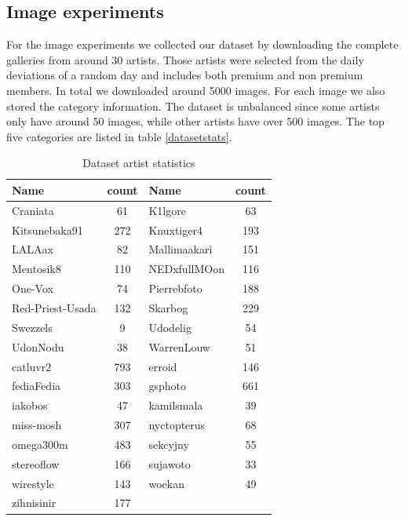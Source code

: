 \subsection{Image experiments}
For the image experiments we collected our dataset by downloading the complete galleries from around 30 artists.
Those artists were selected from the daily deviations of a random day and includes both premium and non premium members.
In total we downloaded around 5000 images. 
For each image we also stored the category information.
The dataset is unbalanced since some artists only have around 50 images, while other artists have over 500 images.
The top five categories are listed in table \ref{datasetstats}.


\begin{table}[htb]
    \centering
    \begin{tabular}
        { | l | c | l | c|} 
        \hline
        Name & count & Name & count \\
        \hline
    Craniata &  61 & K1lgore & 63 \\
    Kitsunebaka91 & 272  & Knuxtiger4 & 193 \\
    LALAax & 82  & Mallimaakari & 151 \\
    Mentosik8 & 110 & NEDxfullMOon & 116 \\
    One-Vox & 74 & Pierrebfoto & 188 \\
    Red-Priest-Usada & 132 & Skarbog & 229 \\
    Swezzels & 9 & Udodelig & 54 \\
    UdonNodu & 38 & WarrenLouw & 51 \\
    catluvr2 & 793 & erroid & 146 \\
    fediaFedia & 303 & gsphoto & 661 \\
    iakobos & 47 & kamilsmala & 39 \\
    miss-mosh & 307 & nyctopterus & 68 \\
    omega300m & 483 & sekcyjny & 55 \\
    stereoflow & 166 & sujawoto & 33 \\
    wirestyle & 143 & woekan & 49 \\
    zihnisinir & 177 \\

        \hline 
    \end{tabular}
    \caption{Dataset artist statistics}
    \label{datasetstats2}
\end{table}

